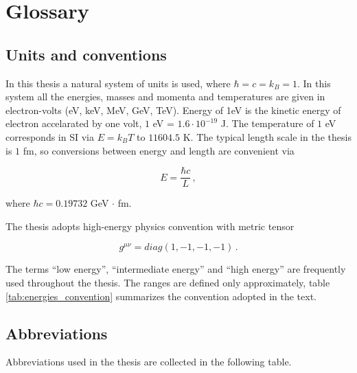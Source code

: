 
\chapter{Glossary}

\section{Units and conventions}

In this thesis a natural system of units is used, where $\hbar = c = k_B = 1$.
In this system all the energies, masses and momenta and temperatures are given in
electron-volts (eV, keV, MeV, GeV, TeV). Energy of \unit{1}{eV} is the kinetic
energy of electron accelarated by one volt, $1$ eV = $1.6 \cdot 10^{-19}$ J.
The temperature of $1$ eV corresponds in SI via $E = k_B T$ to $11604.5$ K.
The typical length scale in the thesis is $1$ fm, so conversions between
energy and length are convenient via

\begin{equation}
  E = \frac{\hbar c}{L} \,,
\end{equation}

where $\hbar c = 0.19732$ GeV $\cdot$ fm.

The thesis adopts high-energy physics convention with metric tensor

\begin{equation}
  g^{\mu\nu} = diag(1, -1, -1, -1) \,.
\end{equation}

The terms ``low energy'', ``intermediate energy'' and ``high energy'' are frequently
used throughout the thesis. The ranges are defined only approximately, table
\ref{tab:energies_convention} summarizes the convention adopted in the text.

\section{Abbreviations}

Abbreviations used in the thesis are collected in the following table.

